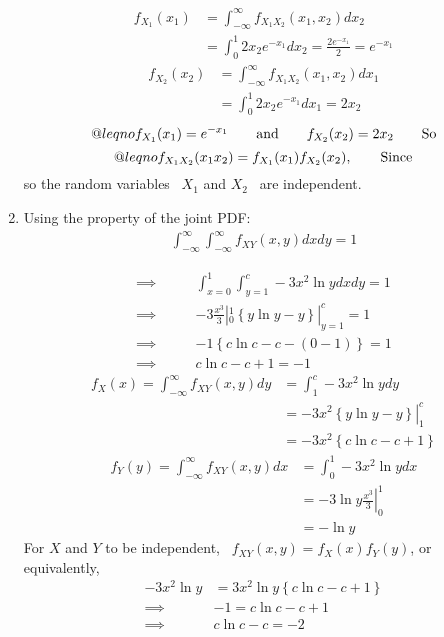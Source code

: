 \documentclass[11pt]{article}
\makeatletter
\newcommand{\LeftEqNo}{\let\veqno\@@leqno}
\makeatother
\begin{document}
\begin{enumerate}[1: ]
	\begin{align}
	f_{X_1}(x_1) &= \int_{-\infty}^\infty f_{X_1X_2}(x_1,x_2)dx_2\nonumber\\
		&= \int_{0}^1 2x_2 e^{-x_1} dx_2 
				= \frac{2e^{-x_1}}{2}=e^{-x_1} \label{fx1fx2eq1}
	\end{align}
	\begin{align}
	f_{X_2}(x_2) &= \int_{-\infty}^\infty f_{X_1X_2}(x_1,x_2)dx_1\nonumber\\
		&= \int_{0}^1 2x_2 e^{-x_1} dx_1 
				= 2 x_2 	\label{fx1fx2eq2}
	\end{align}
	\begin{equation}\LeftEqNo
	f_{X_1}(x_1) = e^{-x_1} \qquad \text{and} \qquad f_{X_2}(x_2) = 2 x_2
		\tag*{So}
	\end{equation}
	\begin{equation}\LeftEqNo
	f_{X_1X_2}(x_1 x_2) = f_{X_1}(x_1) f_{X_2}(x_2), \tag*{Since}
	\end{equation}
	so the random variables \ $X_1$ and $X_2$ \ are independent.
\item Using the property of the joint PDF:
	\begin{align*}
	\int_{-\infty}^\infty \int_{-\infty}^\infty f_{XY}(x,y)dx dy = 1
	\end{align*}

	\begin{align*}
	\implies \qquad & 
		\int_{x=0}^1 \int_{y=1}^c -3x^2 \ln y dx dy = 1 \\
	\implies \qquad & 
		-3 \frac{x^3}{3} \left\vert_0^1
		\left\{ y\ln y - y \right\} \right\vert_{y=1}^c = 1 \\
	\implies \qquad & 
		-1 \left\{ c\ln c - c -(0-1) \right\} = 1 \\
	\implies \qquad & c\ln c - c +1 =-1 
	\end{align*}
	\begin{align*}
	f_X(x) = \int_{-\infty}^\infty f_{XY}(x,y) dy 
		&= \int_{1}^c -3 x^2 \ln y dy \\
		&= \left. -3x^2 \left\{ y \ln y -y\right\} \right|_{1}^{c} \\ 
		&= -3x^2 \left\{ c \ln c -c +1 \right\} 
	\end{align*}
	\begin{align*}
	f_Y(y) = \int_{-\infty}^\infty f_{XY}(x,y) dx
		&= \int_{0}^1 -3 x^2 \ln y dx \\
		&= \left. -3\ln y \frac{x^3}{3}  \right|_{0}^{1} \\ 
		&= -\ln y
	\end{align*}
	For $X$ and $Y$ to be independent, \ $f_{XY}(x,y) = f_{X}(x) f_{Y}(y)$, 
	or equivalently, 
	\begin{align*}
		- 3x^2 \ln y &= 3x^2 \ln y \left\{ c \ln c -c +1 \right\} \\
	\implies \qquad & - 1 = c \ln c -c + 1 \\
	\implies \qquad & c \ln c -c = -2 
	\end{align*}


\end{enumerate}
\end{document}
